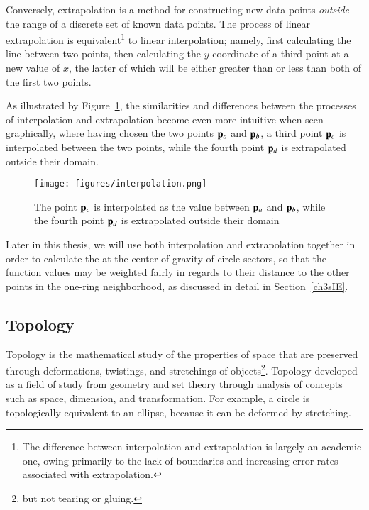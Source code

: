 Conversely, extrapolation is a method for constructing new data points \textit{outside} the range of a discrete set of known data points. The process of linear extrapolation is equivalent\footnote{The difference between interpolation and extrapolation is largely an academic one, owing primarily to the lack of boundaries and increasing error rates associated with extrapolation.} to linear interpolation; namely, first calculating the line between two points, then calculating the $y$ coordinate of a third point at a new value of $x$, the latter of which will be either greater than or less than both of the first two points.

As illustrated by Figure~\ref{fig:interpolation}, the similarities and differences between the processes of interpolation and extrapolation become even more intuitive when seen graphically, where having chosen the two points $\mathbf{p}_a$ and $\mathbf{p}_b$, a third point $\mathbf{p}_c$ is interpolated between the two points, while the fourth point $\mathbf{p}_d$ is extrapolated outside their domain.

\begin{figure}[ht]
\ffigbox
	{\texttt{[image: figures/interpolation.png]}}
	{\caption[Interpolation and Extrapolation in $\bR{2}$]{The point $\mathbf{p}_c$ is interpolated as the value between $\mathbf{p}_a$ and $\mathbf{p}_b$, while the fourth point $\mathbf{p}_d$ is extrapolated outside their domain}\label{fig:interpolation}}
\end{figure}

Later in this thesis, we will use both interpolation and extrapolation together in order to calculate the  at the center of gravity of circle sectors, so that the function values may be weighted fairly in regards to their distance to the other points in the one-ring neighborhood, as discussed in detail in Section~\ref{ch3sIE}.

%
%
%
%
\subsection{Topology}
\label{ch2sETBssT}
Topology is the mathematical study of the properties of space that are preserved through deformations, twistings, and stretchings of objects\footnote{but not tearing or gluing.}. Topology developed as a field of study from geometry and set theory through analysis of concepts such as space, dimension, and transformation. For example, a circle is topologically equivalent to an ellipse, because it can be deformed by stretching.~\cite{Weisstein19c}

